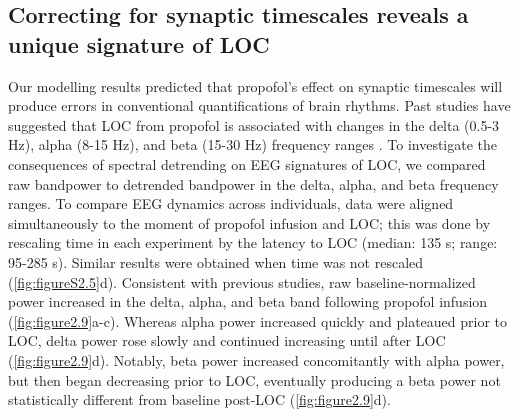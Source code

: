 \subsection{Correcting for synaptic timescales reveals a unique signature of LOC}
Our modelling results predicted that propofol’s effect on synaptic timescales will produce errors in conventional quantifications of brain rhythms. Past studies have suggested that LOC from propofol is associated with changes in the delta (0.5-3 \unit{\hertz}), alpha (8-15 \unit{\hertz}), and beta (15-30 \unit{\hertz}) frequency ranges \cite{Purdon2013}. To investigate the consequences of spectral detrending on EEG signatures of LOC, we compared raw bandpower to detrended bandpower in the delta, alpha, and beta frequency ranges. To compare EEG dynamics across individuals, data were aligned simultaneously to the moment of propofol infusion and LOC; this was done by rescaling time in each experiment by the latency to LOC (median: 135 s; range: 95-285 s). Similar results were obtained when time was not rescaled (\autoref{fig:figureS2.5}d). Consistent with previous studies\cite{Purdon2013}, raw baseline-normalized power increased in the delta, alpha, and beta band following propofol infusion (\autoref{fig:figure2.9}a-c). Whereas alpha power increased quickly and plateaued prior to LOC, delta power rose slowly and continued increasing until after LOC (\autoref{fig:figure2.9}d). Notably, beta power increased concomitantly with alpha power, but then began decreasing prior to LOC, eventually producing a beta power not statistically different from baseline post-LOC (\autoref{fig:figure2.9}d). 




